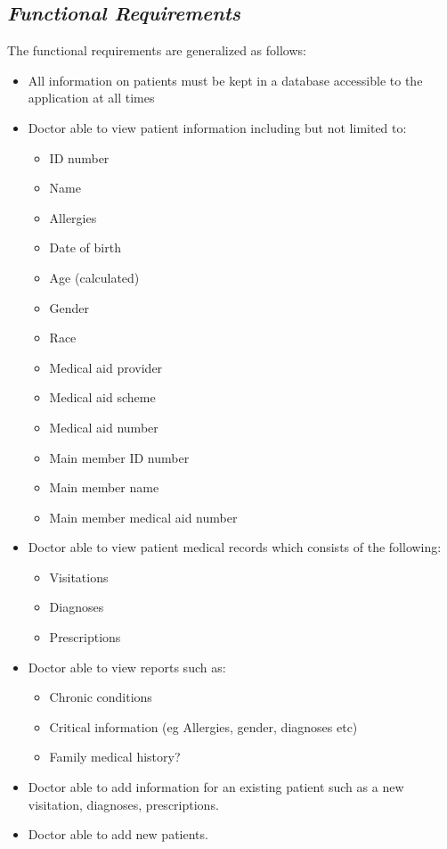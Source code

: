 \documentclass[a4paper]{article}
\begin{document}
\subsection{\textit{Functional Requirements}}
The functional requirements are generalized as follows:
\begin{itemize}
	\item All information on patients must be kept in a database accessible to the application at all times
	\item Doctor able to view patient information including but not limited to:
		\begin{itemize}
			\item ID number
			\item Name
			\item Allergies
			\item Date of birth
			\item Age (calculated)
			\item Gender
			\item Race
			\item Medical aid provider
			\item Medical aid scheme
			\item Medical aid number
			\item Main member ID number
			\item Main member name
			\item Main member medical aid number
		\end{itemize}
	\item Doctor able to view patient medical records which consists of the following:
		\begin{itemize}
			\item Visitations
			\item Diagnoses
			\item Prescriptions
		\end{itemize}
	\item Doctor able to view reports such as:
		\begin{itemize}
			\item Chronic conditions
			\item Critical information (eg Allergies, gender, diagnoses etc)
			\item Family medical history?
		\end{itemize}
	\item Doctor able to add information for an existing patient such as a new visitation, diagnoses, prescriptions.
	\item Doctor able to add new patients.
\end{itemize}
\end{document}

